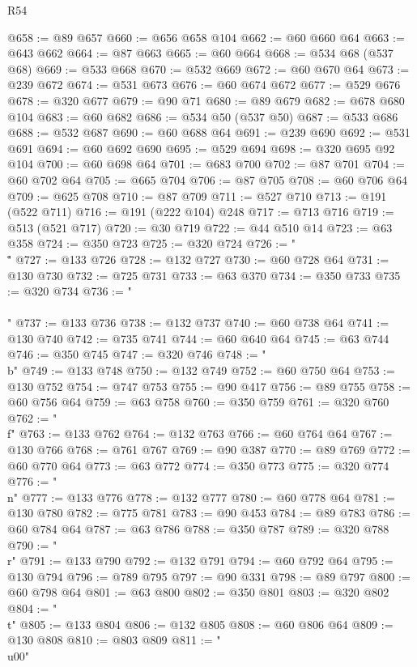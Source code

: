 \begin{lexlean}{R54}
\begin{coremodule}
{{{{{{{{{{{{{{{{{{{{{{{{{{{{{{{{{{{{{{{{{{{{{{{{{{@658 := @89 @657
@660 := @656 @658 @104
@662 := @60 @660 @64
@663 := @643 @662
@664 := @87 @663
@665 := @60 @664
@668 := @534 @68 (@537 @68)
@669 := @533 @668
@670 := @532 @669
@672 := @60 @670 @64
@673 := @239 @672
@674 := @531 @673
@676 := @60 @674 @672
@677 := @529 @676
@678 := @320 @677
@679 := @90 @71
@680 := @89 @679
@682 := @678 @680 @104
@683 := @60 @682
@686 := @534 @50 (@537 @50)
@687 := @533 @686
@688 := @532 @687
@690 := @60 @688 @64
@691 := @239 @690
@692 := @531 @691
@694 := @60 @692 @690
@695 := @529 @694
@698 := @320 @695 @92 @104
@700 := @60 @698 @64
@701 := @683 @700
@702 := @87 @701
@704 := @60 @702 @64
@705 := @665 @704
@706 := @87 @705
@708 := @60 @706 @64
@709 := @625 @708
@710 := @87 @709
@711 := @527 @710
@713 := @191 (@522 @711)
@716 := @191 (@222 @104) @248
@717 := @713 @716
@719 := @513 (@521 @717)
@720 := @30 @719
@722 := @44 @510 @14
@723 := @63 @358
@724 := @350 @723
@725 := @320 @724
@726 := "\\\""
@727 := @133 @726
@728 := @132 @727
@730 := @60 @728 @64
@731 := @130 @730
@732 := @725 @731
@733 := @63 @370
@734 := @350 @733
@735 := @320 @734
@736 := "\\\\"
@737 := @133 @736
@738 := @132 @737
@740 := @60 @738 @64
@741 := @130 @740
@742 := @735 @741
@744 := @60 @640 @64
@745 := @63 @744
@746 := @350 @745
@747 := @320 @746
@748 := "\\b"
@749 := @133 @748
@750 := @132 @749
@752 := @60 @750 @64
@753 := @130 @752
@754 := @747 @753
@755 := @90 @417
@756 := @89 @755
@758 := @60 @756 @64
@759 := @63 @758
@760 := @350 @759
@761 := @320 @760
@762 := "\\f"
@763 := @133 @762
@764 := @132 @763
@766 := @60 @764 @64
@767 := @130 @766
@768 := @761 @767
@769 := @90 @387
@770 := @89 @769
@772 := @60 @770 @64
@773 := @63 @772
@774 := @350 @773
@775 := @320 @774
@776 := "\\n"
@777 := @133 @776
@778 := @132 @777
@780 := @60 @778 @64
@781 := @130 @780
@782 := @775 @781
@783 := @90 @453
@784 := @89 @783
@786 := @60 @784 @64
@787 := @63 @786
@788 := @350 @787
@789 := @320 @788
@790 := "\\r"
@791 := @133 @790
@792 := @132 @791
@794 := @60 @792 @64
@795 := @130 @794
@796 := @789 @795
@797 := @90 @331
@798 := @89 @797
@800 := @60 @798 @64
@801 := @63 @800
@802 := @350 @801
@803 := @320 @802
@804 := "\\t"
@805 := @133 @804
@806 := @132 @805
@808 := @60 @806 @64
@809 := @130 @808
@810 := @803 @809
@811 := "\\u00"
}}}}}}}}}}}}}}}}}}}}}}}}}}}}}}}}}}}}}}}}}}}}}}}}}}
\end{coremodule}
\end{lexlean}
